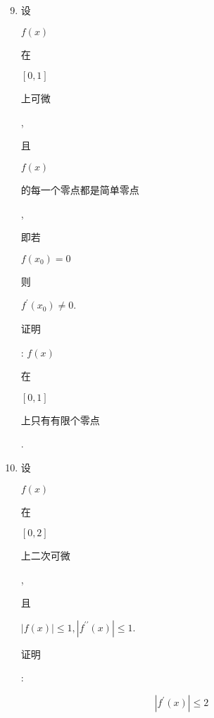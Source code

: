 \documentclass[10pt]{article}
\begin{document}
\begin{enumerate}
  \setcounter{enumi}{8}
  \item \begin{CJK}{UTF8}{mj}设\end{CJK} $f(x)$ \begin{CJK}{UTF8}{mj}在\end{CJK} $[0,1]$ \begin{CJK}{UTF8}{mj}上可微\end{CJK}, \begin{CJK}{UTF8}{mj}且\end{CJK} $f(x)$ \begin{CJK}{UTF8}{mj}的每一个零点都是简单零点\end{CJK}, \begin{CJK}{UTF8}{mj}即若\end{CJK} $f\left(x_{0}\right)=0$ \begin{CJK}{UTF8}{mj}则\end{CJK} $f^{\prime}\left(x_{0}\right) \neq 0$. \begin{CJK}{UTF8}{mj}证明\end{CJK}: $f(x)$ \begin{CJK}{UTF8}{mj}在\end{CJK} $[0,1]$ \begin{CJK}{UTF8}{mj}上只有有限个零点\end{CJK}.

  \item \begin{CJK}{UTF8}{mj}设\end{CJK} $f(x)$ \begin{CJK}{UTF8}{mj}在\end{CJK} $[0,2]$ \begin{CJK}{UTF8}{mj}上二次可微\end{CJK}, \begin{CJK}{UTF8}{mj}且\end{CJK} $|f(x)| \leq 1,\left|f^{\prime \prime}(x)\right| \leq 1$. \begin{CJK}{UTF8}{mj}证明\end{CJK}:

\end{enumerate}
$$
\left|f^{\prime}(x)\right| \leq 2
$$
\end{document}
